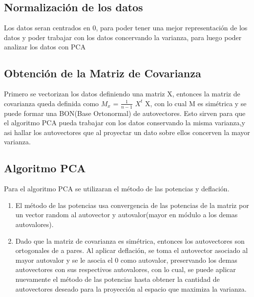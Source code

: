 \subsection{Normalización de los datos}
Los datos seran centrados en 0, para poder tener una mejor representación de los
datos y poder trabajar con los datos concervando la varianza, para luego poder analizar
los datos con PCA

\subsection{Obtención de la Matriz de Covarianza}
Primero se vectorizan los datos definiendo una matriz X, entonces la matriz de
covarianza queda definida como $M_{x}$ = $\frac{1}{n-1}$ $X^{t}$ X, con lo cual
M es simétrica y se puede formar una BON(Base Ortonormal) de autovectores. Esto sirven
para que el algoritmo PCA pueda trabajar con los datos conservando la misma varianza,y asi hallar los autovectores que al proyectar un dato sobre
ellos concerven la mayor varianza.

\subsection{Algoritmo PCA}
Para el algoritmo PCA se utilizaran el método de las potencias y deflación. 
\begin{enumerate}
\item El método de las potencias usa convergencia de las potencias de la matriz por un vector random al autovector y  autovalor(mayor en módulo a los demas autovalores).
\item Dado que la matriz de covarianza es simétrica, entonces los autovectores son ortogonales de a pares. Al aplicar deflación, se toma el autovector asociado al mayor autovalor y se le asocia el 0 como autovalor, preservando los demas autovectores con sus respectivos autovalores, con lo cual, se puede aplicar nuevamente el método de las potencias hasta obtener la cantidad de autovectores deseado para la proyección al espacio que maximiza la varianza.

\end{enumerate}


